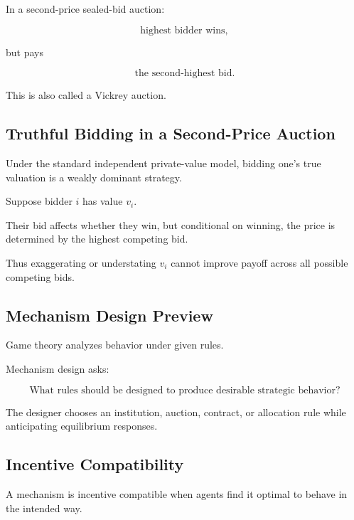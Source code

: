 In a second-price sealed-bid auction:

\[
\boxed{
\text{highest bidder wins},
}
\]

but pays

\[
\boxed{
\text{the second-highest bid}.
}
\]

This is also called a Vickrey auction.

\subsection{Truthful Bidding in a Second-Price Auction}
\label{subsec:truthful-vickrey}

Under the standard independent private-value model, bidding one's true
valuation is a weakly dominant strategy.

Suppose bidder \(i\) has value \(v_i\).

Their bid affects whether they win, but conditional on winning, the price
is determined by the highest competing bid.

Thus exaggerating or understating \(v_i\) cannot improve payoff across all
possible competing bids.

\subsection{Mechanism Design Preview}
\label{subsec:mechanism-design-preview}

Game theory analyzes behavior under given rules.

Mechanism design asks:

\[
\boxed{
\text{What rules should be designed to produce desirable strategic
behavior?}
}
\]

The designer chooses an institution, auction, contract, or allocation rule
while anticipating equilibrium responses.

\subsection{Incentive Compatibility}
\label{subsec:incentive-compatibility}

A mechanism is incentive compatible when agents find it optimal to behave
in the intended way.

